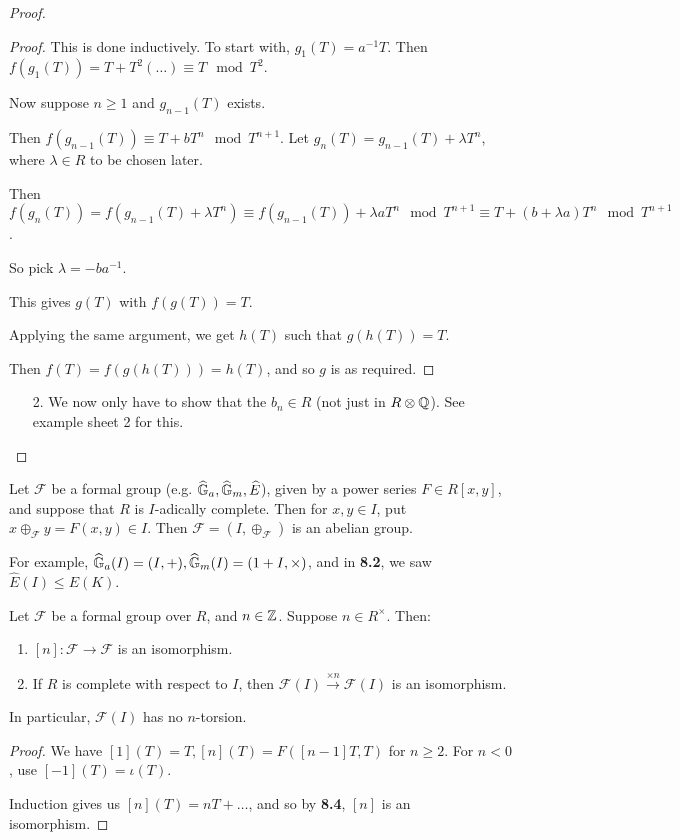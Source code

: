 \documentclass[10pt,a4paper]{article}
\begin{document}
\begin{proof}
\begin{proof}
    This is done inductively. To start with, $g_1(T) = a^{-1}T$. Then $f(g_1(T)) = T+T^2(\ldots) \equiv T \mod T^2$.

    Now suppose $n\geq 1$ and $g_{n-1}(T)$ exists.

    Then $f(g_{n-1}(T)) \equiv T + bT^n \mod T^{n+1}$. Let $g_n(T) = g_{n-1}(T) + \lambda T^n$, where $\lambda \in R$ to be chosen later.

    Then $f(g_n(T)) = f(g_{n-1}(T)+\lambda T^n) \equiv f(g_{n-1}(T)) + \lambda aT^{n} \mod T^{n+1} \equiv T + (b+\lambda a)T^{n} \mod T^{n+1}$.

    So pick $\lambda = -ba^{-1}$.

    This gives $g(T)$ with $f(g(T)) = T$.

    Applying the same argument, we get $h(T)$ such that $g(h(T)) = T$.

    Then $f(T) = f(g(h(T))) = h(T)$, and so $g$ is as required.
  \end{proof}
  \begin{enumerate}
    \item[2.] We now only have to show that the $b_n \in R$ (not just in $R \otimes \mathbb{Q}$). See example sheet 2 for this.
  \end{enumerate}
\end{proof}
Let $\mathscr{F}$ be a formal group (e.g. $\widehat{\mathbb{G}}_a, \widehat{\mathbb{G}}_m, \widehat{E}$), given by a power series $F \in R[x,y]$, and suppose that $R$ is $I$-adically complete. Then for $x, y \in I$, put $x \oplus_{\mathscr{F}} y = F(x,y) \in I$. Then $\mathscr{F} = (I, \oplus_{\mathscr{F}})$ is an abelian group.

For example, $\widehat{\mathbb{G}}_a(I) = (I, +), \widehat{\mathbb{G}}_m(I) = (1+I, \times)$, and in \textbf{8.2}, we saw $\hat{E}(I) \leq E(K)$.

\begin{corollary}
  Let $\mathscr{F}$ be a formal group over $R$, and $n \in \mathbb{Z}$. Suppose $n \in R^\times$. Then:
  \begin{enumerate}
    \item $[n]:\mathscr{F} \to \mathscr{F}$ is an isomorphism.
    \item If $R$ is complete with respect to $I$, then $\mathscr{F}(I) \xrightarrow{\times n} \mathscr{F}(I)$ is an isomorphism.
  \end{enumerate}
  In particular, $\mathscr{F}(I)$ has no $n$-torsion.
\end{corollary}
\begin{proof}
  We have $[1](T) = T, [n](T) = F([n-1]T, T)$ for $n \geq 2$. For $n < 0$, use $[-1](T) = \iota(T)$.

  Induction gives us $[n](T) = nT + \ldots$, and so by \textbf{8.4}, $[n]$ is an isomorphism.
\end{proof}
\end{document}
